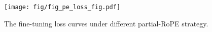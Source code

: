 \begin{figure}[t]
  \centering
  \texttt{[image: fig/fig\_pe\_loss\_fig.pdf]}
  \caption{The fine-tuning loss curves under different partial-RoPE strategy.}
  \label{fig:pe_loss}
  \vspace{-0.3cm}
\end{figure}